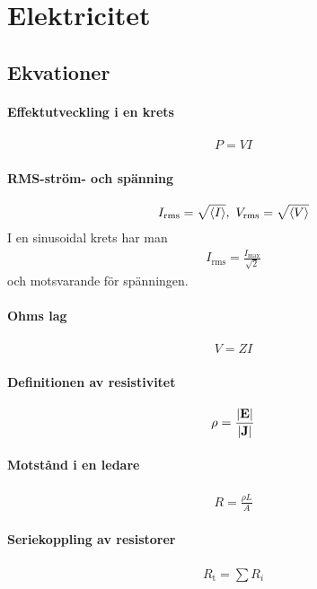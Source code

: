 \section{Elektricitet}

\subsection{Ekvationer}

\paragraph{Effektutveckling i en krets}
\begin{align*}
	P = VI
\end{align*}

\paragraph{RMS-ström- och spänning}
\begin{align*}
	I_{\text{rms}} = \sqrt{\expval{I}},\ V_{\text{rms}} = \sqrt{\expval{V}}
\end{align*}
I en sinusoidal krets har man
\begin{align*}
	I_{\text{rms}} = \frac{I_{\text{max}}}{\sqrt{2}}
\end{align*}
och motsvarande för spänningen.

\paragraph{Ohms lag}
\begin{align*}
	V = ZI
\end{align*}

\paragraph{Definitionen av resistivitet}
\begin{align*}
	\rho = \frac{\abs{\vect{E}}}{\abs{\vect{J}}}
\end{align*}

\paragraph{Motstånd i en ledare}
\begin{align*}
	R = \frac{\rho L}{A}
\end{align*}

\paragraph{Seriekoppling av resistorer}
\begin{align*}
	R_\text{t} = \sum R_i
\end{align*}

